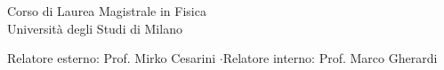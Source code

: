 \documentclass[aspectratio=169, 10pt]{beamer}
\begin{document}
\begin{frame}[plain]
\begin{center}
        \vspace{0.2cm}
        {\small\color{gray!60} Corso di Laurea Magistrale in Fisica\\
        Universit\`a degli Studi di Milano}

        \vspace{0.3cm}
        {\footnotesize\color{gray!50}
        Relatore esterno: Prof. Mirko Cesarini \quad$\cdot$\quad Relatore interno: Prof. Marco Gherardi}

        \vspace{0.2cm}
        
    \end{center}
\end{frame}

\end{document}
